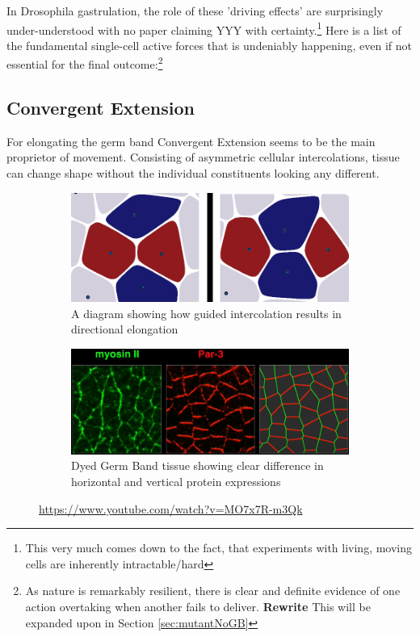 In Drosophila gastrulation, the role of these 'driving effects' are surprisingly under-understood with no paper claiming YYY with certainty.\footnote{This very much comes down to the fact, that experiments with living, moving cells are inherently intractable/hard} Here is a list of the fundamental single-cell active forces that is undeniably happening, even if not essential for the final outcome:\footnote{As nature is remarkably resilient, there is clear and definite evidence of one action overtaking when another fails to deliver. \textbf{Rewrite} This will be expanded upon in Section \ref{sec:mutantNoGB}} 

\subsection{Convergent Extension}
For elongating the germ band Convergent Extension seems to be the main proprietor of movement. Consisting of asymmetric cellular intercolations, tissue can change shape without the individual constituents looking any different.  

\begin{figure}[H]
    \centering
    \begin{subfigure}{0.45\linewidth}
        \centering
    \includegraphics[width=\linewidth]{chapters/Theory/figures/ConvergentExtensionDiagram.png}
    \caption{A diagram showing how guided intercolation results in directional elongation}
    \end{subfigure}
        \begin{subfigure}{0.45\linewidth}
        \centering
        \caption{Dyed Germ Band tissue showing clear difference in horizontal and vertical protein expressions}
    \includegraphics[width=\linewidth]{chapters/Theory/figures/bipolar-PCP.png}
    \end{subfigure}
    \caption{\cite{zallen2004patterned}\url{https://www.youtube.com/watch?v=MO7x7R-m3Qk}}
    
    \label{fig:ConvergentExtensionDiagram}
\end{figure}

